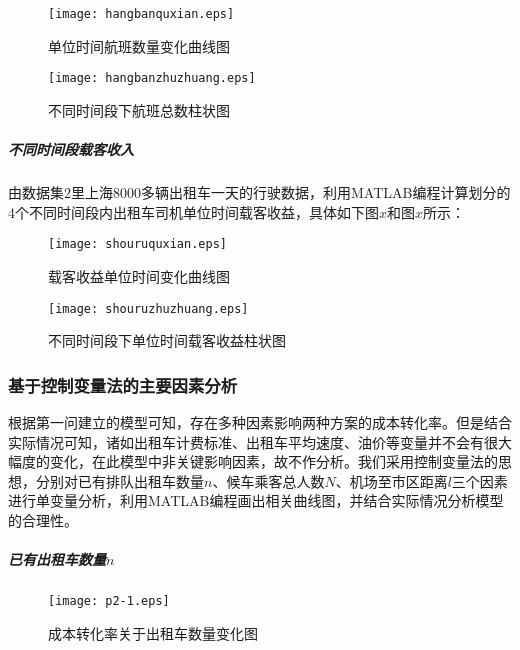\documentclass[withoutpreface,bwprint]{cumcmthesis} %
\begin{document}
	\begin{figure}[htbp]
		\begin{minipage}[t]{0.45\linewidth}
			\centering
		\texttt{[image: hangbanquxian.eps]}
			\caption{单位时间航班数量变化曲线图}
		\end{minipage}%
		\begin{minipage}[t]{0.45\linewidth}
			\centering
	\texttt{[image: hangbanzhuzhuang.eps]}
			\caption{不同时间段下航班总数柱状图}
		\end{minipage}
	\end{figure}




\subparagraph{不同时间段载客收入}由数据集$2$里上海8000多辆出租车一天的行驶数据，利用MATLAB编程计算划分的$4$个不同时间段内出租车司机单位时间载客收益，具体如下图$x$和图$x$所示：





	\begin{figure}[htbp]
		\begin{minipage}[t]{0.45\linewidth}
			\centering
	\texttt{[image: shouruquxian.eps]}
			\caption{载客收益单位时间变化曲线图}
		\end{minipage}%
		\begin{minipage}[t]{0.45\linewidth}
			\centering
	\texttt{[image: shouruzhuzhuang.eps]}
			\caption{不同时间段下单位时间载客收益柱状图}
		\end{minipage}
	\end{figure}



\subsubsection{基于控制变量法的主要因素分析}根据第一问建立的模型可知，存在多种因素影响两种方案的成本转化率。但是结合实际情况可知，诸如出租车计费标准、出租车平均速度、油价等变量并不会有很大幅度的变化，在此模型中非关键影响因素，故不作分析。我们采用控制变量法的思想，分别对已有排队出租车数量$n$、候车乘客总人数$N$、机场至市区距离$l$三个因素进行单变量分析，利用MATLAB编程画出相关曲线图，并结合实际情况分析模型的合理性。



\subparagraph{已有出租车数量$n$}

 \begin{figure}[H]
  	\centering
	\texttt{[image: p2-1.eps]}
  	\caption{成本转化率关于出租车数量变化图}
  \end{figure}
\end{document}
